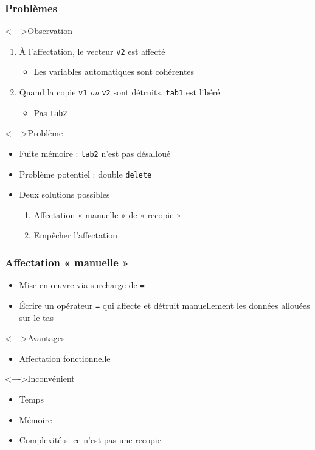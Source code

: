 \begin{frame}
\frametitle{Problèmes}
\begin{exampleblock}<+->{Observation}
	\begin{enumerate}[<+->]
	\item À l'affectation, le vecteur \texttt{v2} est affecté
		\begin{itemize}
		\item Les variables automatiques sont cohérentes
		\end{itemize}
	\item Quand la copie \texttt{v1} \emph{ou} \texttt{v2} sont détruits, \texttt{tab1} est libéré
		\begin{itemize}
		\item Pas \texttt{tab2}
		\end{itemize}
	\end{enumerate}
\end{exampleblock}
\begin{alertblock}<+->{Problème}
	\begin{itemize}[<+->]
	\item Fuite mémoire : \texttt{tab2} n'est pas désalloué
	\item Problème potentiel : double \lstinline|delete|
	\end{itemize}
\end{alertblock}
\begin{itemize}[<+->]
\item Deux solutions possibles
	\begin{enumerate}
	\item Affectation « manuelle » de « recopie »
	\item Empêcher l'affectation
	\end{enumerate}
\end{itemize}
\end{frame}

\begin{frame}
\frametitle{Affectation « manuelle »}
\begin{itemize}[<+->]
\item Mise en œuvre via surcharge de \texttt{=}
\item Écrire un opérateur \texttt{=} qui affecte et détruit manuellement les données allouées sur le tas
\end{itemize}
\begin{exampleblock}<+->{Avantages}
	\begin{itemize}[<+->]
	\item Affectation fonctionnelle
	\end{itemize}
\end{exampleblock}
\begin{alertblock}<+->{Inconvénient}
	\begin{itemize}[<+->]
	\item Temps
	\item Mémoire
	\item Complexité si ce n'est pas une recopie
	\end{itemize}
\end{alertblock}
\end{frame}

